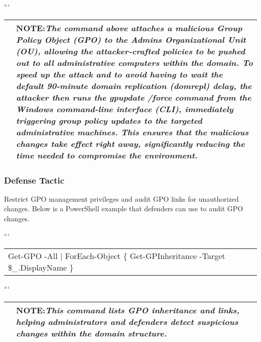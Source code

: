 ```

\begin{table}
\centering

\begin{tabular}{l l}
\hline
   & \textbf{NOTE:}\textit{The command above attaches a malicious Group Policy Object (GPO) to the Admins Organizational Unit (OU), allowing the attacker-crafted policies to be pushed out to all administrative computers within the domain. To speed up the attack and to avoid having to wait the default 90-minute domain replication (}\textit{domrepl}\textit{) delay, the attacker then runs the }\textit{gpupdate }\textit{/force}\textit{ command from the Windows command-line interface (CLI), immediately triggering group policy updates to the targeted administrative machines. This ensures that the malicious changes take effect right away, significantly reducing the time needed to compromise the environment.} \\
\hline

\end{tabular}

\end{table}

\subsubsection{Defense Tactic}

Restrict GPO management privileges and audit GPO links for unauthorized changes. Below is a PowerShell example that defenders can use to audit GPO changes.

```

\begin{table}
\centering

\begin{tabular}{l}
Get-GPO -All | ForEach-Object \{ Get-GPInheritance -Target \$\_.DisplayName \} \\

\end{tabular}

\end{table}

```

\begin{table}
\centering

\begin{tabular}{l l}
\hline
   & \textbf{NOTE:}\textit{This command lists GPO inheritance and links, helping administrators and defenders detect suspicious changes within the domain structure.} \\
\hline

\end{tabular}

\end{table}

